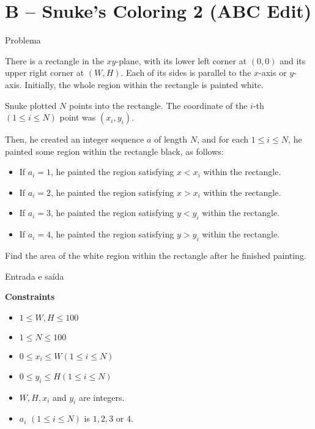 \section{B -- Snuke's Coloring 2 (ABC Edit)}

\begin{frame}[fragile]{Problema}

There is a rectangle in the $xy$-plane, with its lower left corner at $(0, 0)$ and its upper 
right corner at $(W, H)$. Each of its sides is parallel to the $x$-axis or $y$-axis. Initially, 
the whole region within the rectangle is painted white.

Snuke plotted $N$ points into the rectangle. The coordinate of the $i$-th $(1\leq i\leq N)$ 
point was $(x_i, y_i)$.

Then, he created an integer sequence $a$ of length $N$, and for each $1\leq i\leq N$, he
painted some region within the rectangle black, as follows:

\begin{itemize}

    \item If $a_i = 1$, he painted the region satisfying $x < x_i$ within the rectangle.
    \item If $a_i = 2$, he painted the region satisfying $x > x_i$ within the rectangle.
    \item If $a_i = 3$, he painted the region satisfying $y < y_i$ within the rectangle.
    \item If $a_i = 4$, he painted the region satisfying $y > y_i$ within the rectangle.

\end{itemize}

Find the area of the white region within the rectangle after he finished painting.

\end{frame}

\begin{frame}[fragile]{Entrada e saída}

\textbf{Constraints}

\begin{itemize}
    \item $1\leq W, H\leq 100$
    \item $1\leq N\leq 100$
    \item $0\leq x_i\leq W (1\leq i\leq N)$
    \item $0\leq y_i\leq H (1\leq i\leq N)$
    \item $W, H, x_i$ and $y_i$ are integers.
    \item $a_i$ $(1\leq i\leq N)$ is $1, 2, 3$ or $4$.
\end{itemize}

\end{frame}

